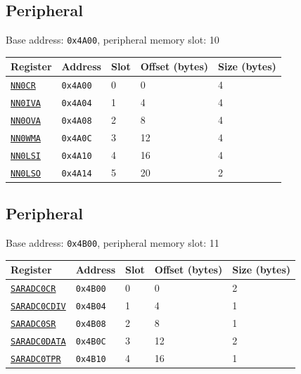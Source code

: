\subsection{ Peripheral}
\noindent Base address: \texttt{0x4A00}, peripheral memory slot: 10

\begin{tabularx}{\textwidth}{ l l l l X }
\textbf{Register} & \textbf{Address} & \textbf{Slot} & \textbf{Offset (bytes)} & \textbf{Size (bytes)} \\ \hline
\hyperref[ss:NNxCR]{\texttt{NN0CR}} & \texttt{0x4A00} & 0 & 0 & 4 \\
\rowcolor{tablehighlightcolor} \hyperref[ss:NNxIVA]{\texttt{NN0IVA}} & \texttt{0x4A04} & 1 & 4 & 4 \\
\hyperref[ss:NNxOVA]{\texttt{NN0OVA}} & \texttt{0x4A08} & 2 & 8 & 4 \\
\rowcolor{tablehighlightcolor} \hyperref[ss:NNxWMA]{\texttt{NN0WMA}} & \texttt{0x4A0C} & 3 & 12 & 4 \\
\hyperref[ss:NNxLSI]{\texttt{NN0LSI}} & \texttt{0x4A10} & 4 & 16 & 4 \\
\rowcolor{tablehighlightcolor} \hyperref[ss:NNxLSO]{\texttt{NN0LSO}} & \texttt{0x4A14} & 5 & 20 & 2 \\
\hline
\end{tabularx}

\subsection{ Peripheral}
\noindent Base address: \texttt{0x4B00}, peripheral memory slot: 11

\begin{tabularx}{\textwidth}{ l l l l X }
\textbf{Register} & \textbf{Address} & \textbf{Slot} & \textbf{Offset (bytes)} & \textbf{Size (bytes)} \\ \hline
\hyperref[ss:SARADCxCR]{\texttt{SARADC0CR}} & \texttt{0x4B00} & 0 & 0 & 2 \\
\rowcolor{tablehighlightcolor} \hyperref[ss:SARADCxCDIV]{\texttt{SARADC0CDIV}} & \texttt{0x4B04} & 1 & 4 & 1 \\
\hyperref[ss:SARADCxSR]{\texttt{SARADC0SR}} & \texttt{0x4B08} & 2 & 8 & 1 \\
\rowcolor{tablehighlightcolor} \hyperref[ss:SARADCxDATA]{\texttt{SARADC0DATA}} & \texttt{0x4B0C} & 3 & 12 & 2 \\
\hyperref[ss:SARADCxTPR]{\texttt{SARADC0TPR}} & \texttt{0x4B10} & 4 & 16 & 1 \\
\hline
\end{tabularx}

